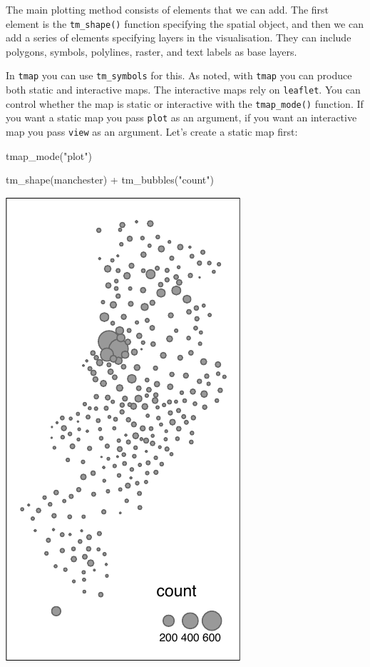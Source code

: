 \documentclass[
  krantz2]{krantz}
\makeatletter
\newenvironment{Shaded}{\begin{snugshade}}{\end{snugshade}}
\newcommand{\FunctionTok}[1]{\textcolor[rgb]{0,0,0}{#1}}
\newcommand{\NormalTok}[1]{#1}
\newcommand{\SpecialCharTok}[1]{\textcolor[rgb]{0,0,0}{#1}}
\newcommand{\StringTok}[1]{\textcolor[rgb]{0.5,0.5,0.5}{#1}}
\newenvironment{kframe}{%
\medskip{}
\setlength{\fboxsep}{.8em}
 \def\at@end@of@kframe{}%
 \ifinner\ifhmode%
  \def\at@end@of@kframe{\end{minipage}}%
  \begin{minipage}{\columnwidth}%
 \fi\fi%
 \def\FrameCommand##1{\hskip\@totalleftmargin \hskip-\fboxsep
 \colorbox{shadecolor}{##1}\hskip-\fboxsep
     \hskip-\linewidth \hskip-\@totalleftmargin \hskip\columnwidth}%
 \MakeFramed {\advance\hsize-\width
   \@totalleftmargin\z@ \linewidth\hsize
   \@setminipage}}%
 {\par\unskip\endMakeFramed%
 \at@end@of@kframe}
\renewenvironment{Shaded}{\begin{kframe}}{\end{kframe}}
\makeatother
\begin{document}
The main plotting method consists of elements that we can add. The first element is the \texttt{tm\_shape()} function specifying the spatial object, and then we can add a series of elements specifying layers in the visualisation. They can include polygons, symbols, polylines, raster, and text labels as base layers.

In \texttt{tmap} you can use \texttt{tm\_symbols} for this. As noted, with \texttt{tmap} you can produce both static and interactive maps. The interactive maps rely on \texttt{leaflet}. You can control whether the map is static or interactive with the \texttt{tmap\_mode()} function. If you want a static map you pass \texttt{plot} as an argument, if you want an interactive map you pass \texttt{view} as an argument. Let's create a static map first:

\begin{Shaded}
\begin{Highlighting}[]
\FunctionTok{tmap\_mode}\NormalTok{(}\StringTok{"plot"}\NormalTok{)}

\FunctionTok{tm\_shape}\NormalTok{(manchester) }\SpecialCharTok{+} 
  \FunctionTok{tm\_bubbles}\NormalTok{(}\StringTok{"count"}\NormalTok{)}
\end{Highlighting}
\end{Shaded}

\includegraphics{crime_mapping_files/figure-latex/unnamed-chunk-78-1.pdf}
\end{document}
